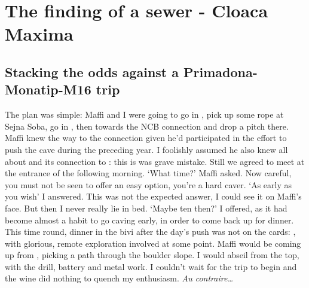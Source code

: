 \section{The finding of a sewer - Cloaca Maxima}

\begin{marginfigure}
\end{marginfigure}

\subsection{Stacking the odds against a Primadona-Monatip-M16 trip}
The plan was simple: Maffi and I were going to go in , pick up some rope at Sejna Soba, go in , then towards the NCB connection and drop a pitch there. Maffi knew the way to the connection given he’d participated in the effort to push the cave during the preceding year. I foolishly assumed he also knew all about  and its connection to : this is was grave mistake. Still we agreed to meet at the entrance of  the following morning. 
‘What time?’ Maffi asked. Now careful, you must not be seen to offer an easy option, you’re a hard caver.
‘As early as you wish’ I answered. This was not the expected answer, I could see it on Maffi’s face. But then I never really lie in bed.
‘Maybe ten then?’ I offered, as it had become almost a habit to go caving early, in order to come back up for dinner. This time round, dinner in the bivi after the day’s push was not on the cards: , with glorious, remote exploration involved at some point. Maffi would be coming up from , picking a path through the boulder slope. I would abseil from the top, with the drill, battery and metal work. I couldn’t wait for the trip to begin and the wine did nothing to quench my enthusiasm. \textit{Au contraire…}

